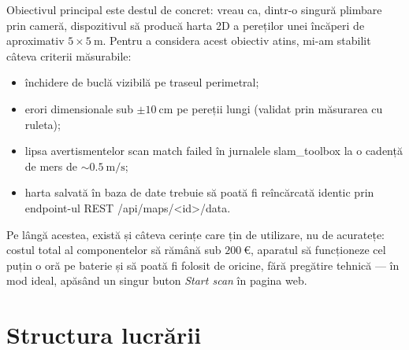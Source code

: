 \documentclass[a4paper,12pt,twoside,openany]{report}
\renewcommand{\texttt}[1]{\textnormal{#1}}
\begin{document}

Obiectivul principal este destul de concret: vreau ca, dintr-o singură
plimbare prin cameră, dispozitivul să producă harta 2D a pereților unei
încăperi de aproximativ $5 \times \SI{5}{\meter}$. Pentru a considera acest
obiectiv atins, mi-am stabilit câteva criterii măsurabile:

\begin{itemize}\itemsep0pt
    \item închidere de buclă vizibilă pe traseul perimetral;
    \item erori dimensionale sub $\pm\SI{10}{\centi\meter}$ pe pereții
          lungi (validat prin măsurarea cu ruleta);
    \item lipsa avertismentelor \texttt{scan match failed} în jurnalele
          \texttt{slam\_toolbox} la o cadență de mers de
          $\sim\SI{0.5}{\meter\per\second}$;
    \item harta salvată în baza de date trebuie să poată fi reîncărcată
          identic prin endpoint-ul REST \texttt{/api/maps/<id>/data}.
\end{itemize}

Pe lângă acestea, există și câteva cerințe care țin de utilizare, nu de
acuratețe: costul total al componentelor să rămână sub $\SI{200}{\euro}$,
aparatul să funcționeze cel puțin o oră pe baterie și să poată fi folosit de
oricine, fără pregătire tehnică — în mod ideal, apăsând un singur buton
\textit{Start scan} în pagina web.

\section{Structura lucrării}
\label{sec:structura}

\end{document}
